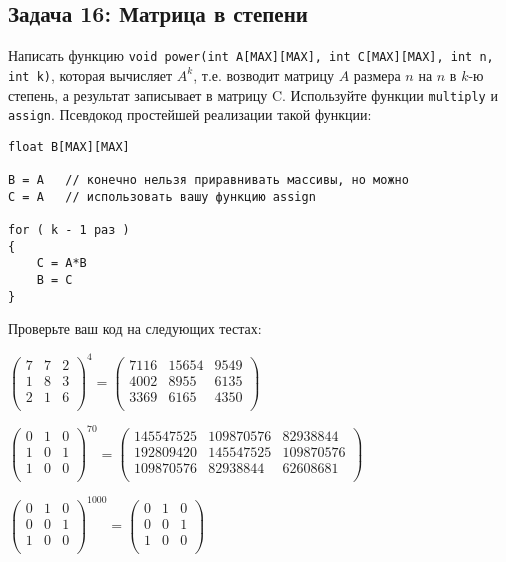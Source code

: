 \documentclass{article}
\begin{document}
\subsection*{Задача 16: Матрица в степени}
Написать функцию \texttt{void power(int A[MAX][MAX], int C[MAX][MAX], int n, int k)}, которая вычисляет $A^k$, т.е. возводит матрицу $A$ размера $n$ на $n$ в $k$-ю степень, а результат записывает в матрицу C. Используйте функции \texttt{multiply} и \texttt{assign}. Псевдокод простейшей реализации такой функции:
\begin{lstlisting}
float B[MAX][MAX]

B = A   // конечно нельзя приравнивать массивы, но можно 
C = A   // использовать вашу функцию assign

for ( k - 1 раз )
{
	C = A*B
	B = C
}
\end{lstlisting}
Проверьте ваш код на следующих тестах:
\begin{center}

$
\begin{pmatrix}
7 & 7 & 2 \\
1 & 8 & 3 \\
2 & 1 & 6 \\
\end{pmatrix}^4 = 
\begin{pmatrix}
7116 & 15654 & 9549 \\
4002 & 8955 & 6135 \\
3369 & 6165 & 4350 \\
\end{pmatrix}
$
\end{center}



\begin{center}
$
\begin{pmatrix}
0 & 1 & 0 \\
1 & 0 & 1 \\
1 & 0 & 0 \\
\end{pmatrix}^{70} = 
\begin{pmatrix}
145547525 & 109870576 & 82938844 \\
192809420 & 145547525 & 109870576 \\
109870576 & 82938844 & 62608681 \\
\end{pmatrix}
$
\end{center}

\begin{center}
$
\begin{pmatrix}
0 & 1 & 0 \\
0 & 0 & 1 \\
1 & 0 & 0 \\
\end{pmatrix}^{1000} = 
\begin{pmatrix}
0 & 1 & 0 \\
0 & 0 & 1 \\
1 & 0 & 0 \\
\end{pmatrix}
$
\end{center}
\end{document}
